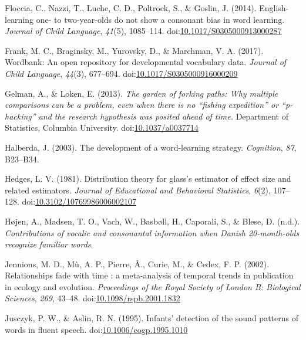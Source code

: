 \documentclass[man]{apa6}
\begin{document}
\leavevmode\hypertarget{ref-Floccia2014}{}%
Floccia, C., Nazzi, T., Luche, C. D., Poltrock, S., \& Goslin, J. (2014). English-learning one- to two-year-olds do not show a consonant bias in word learning. \emph{Journal of Child Language}, \emph{41}(5), 1085--114. doi:\href{https://doi.org/10.1017/S0305000913000287}{10.1017/S0305000913000287}

\leavevmode\hypertarget{ref-Frank2017}{}%
Frank, M. C., Braginsky, M., Yurovsky, D., \& Marchman, V. A. (2017). Wordbank: An open repository for developmental vocabulary data. \emph{Journal of Child Language}, \emph{44}(3), 677--694. doi:\href{https://doi.org/10.1017/S0305000916000209}{10.1017/S0305000916000209}

\leavevmode\hypertarget{ref-Gelman2013}{}%
Gelman, A., \& Loken, E. (2013). \emph{The garden of forking paths: Why multiple comparisons can be a problem, even when there is no ``fishing expedition'' or ``p-hacking'' and the research hypothesis was posited ahead of time.} Department of Statistics, Columbia University. doi:\href{https://doi.org/10.1037/a0037714}{10.1037/a0037714}

\leavevmode\hypertarget{ref-Halberda2003}{}%
Halberda, J. (2003). The development of a word-learning strategy. \emph{Cognition}, \emph{87}, B23--B34.

\leavevmode\hypertarget{ref-Hedges1981}{}%
Hedges, L. V. (1981). Distribution theory for glass's estimator of effect size and related estimators. \emph{Journal of Educational and Behavioral Statistics}, \emph{6}(2), 107--128. doi:\href{https://doi.org/10.3102/10769986006002107}{10.3102/10769986006002107}

\leavevmode\hypertarget{ref-Hojen}{}%
Højen, A., Madsen, T. O., Vach, W., Basbøll, H., Caporali, S., \& Blese, D. (n.d.). \emph{Contributions of vocalic and consonantal information when Danish 20-month-olds recognize familiar words}.

\leavevmode\hypertarget{ref-Jennions2002}{}%
Jennions, M. D., Mù, A. P., Pierre, Â., Curie, M., \& Cedex, F. P. (2002). Relationships fade with time : a meta-analysis of temporal trends in publication in ecology and evolution. \emph{Proceedings of the Royal Society of London B: Biological Sciences}, \emph{269}, 43--48. doi:\href{https://doi.org/10.1098/rspb.2001.1832}{10.1098/rspb.2001.1832}

\leavevmode\hypertarget{ref-Jusczyk1995}{}%
Jusczyk, P. W., \& Aslin, R. N. (1995). Infants' detection of the sound patterns of words in fluent speech. doi:\href{https://doi.org/10.1006/cogp.1995.1010}{10.1006/cogp.1995.1010}
\end{document}
